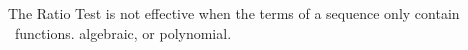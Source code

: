 {The Ratio Test is not effective when the terms of a sequence only contain \underlinespace\ functions.
}
{algebraic, or polynomial.
}
